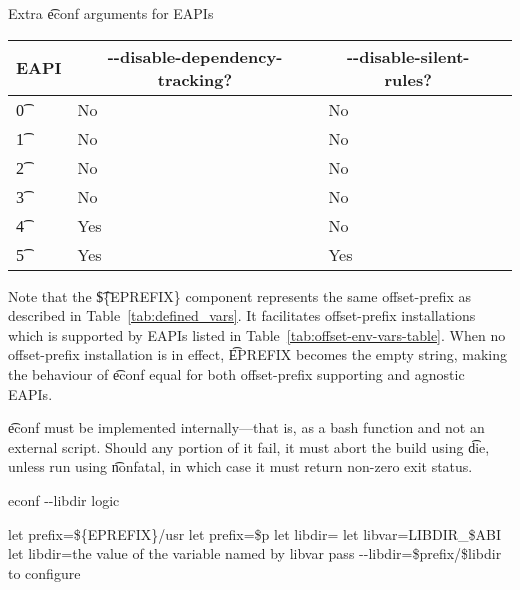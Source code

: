 \begin{description}
    \begin{centertable}{Extra \t{econf} arguments for EAPIs} \label{tab:econf-options-table}
        \begin{tabular}{ l l l l }
            \toprule
                \multicolumn{1}{c}{\textbf{EAPI}} &
                \multicolumn{1}{c}{\textbf{-{}-disable-dependency-tracking}?} &
                \multicolumn{1}{c}{\textbf{-{}-disable-silent-rules}?} \\
                \midrule
        \t{0} & No & No \\
        \t{1} & No & No \\
        \t{2} & No & No \\
        \t{3} & No & No \\
        \t{4} & Yes & No \\
        \t{5} & Yes & Yes \\
        \bottomrule
        \end{tabular}
    \end{centertable}

    Note that the \t{\$\{EPREFIX\}} component represents the same offset-prefix as described in
    Table~\ref{tab:defined_vars}.  It facilitates offset-prefix installations which is supported by
    EAPIs listed in Table~\ref{tab:offset-env-vars-table}. When no offset-prefix installation is in
    effect, \t{EPREFIX} becomes the empty string, making the behaviour of \t{econf} equal for both
    offset-prefix supporting and agnostic EAPIs.

    \t{econf} must be implemented internally---that is, as a bash function and not an external
    script. Should any portion of it fail, it must abort the build using \t{die}, unless run using
    \t{nonfatal}, in which case it must return non-zero exit status.

\begin{algorithm}
\caption{econf -{}-libdir logic} \label{alg:econf-libdir}
\begin{algorithmic}[1]
\STATE let prefix=\$\{EPREFIX\}/usr
    \STATE let prefix=\$p
\ENDIF
\STATE let libdir=
    \STATE let libvar=LIBDIR\_\$ABI
        \STATE let libdir=the value of the variable named by libvar
    \ENDIF
\ENDIF
{}
    \STATE pass -{}-libdir=\$prefix/\$libdir to configure
\ENDIF
\end{algorithmic}
\end{algorithm}


\end{description}
